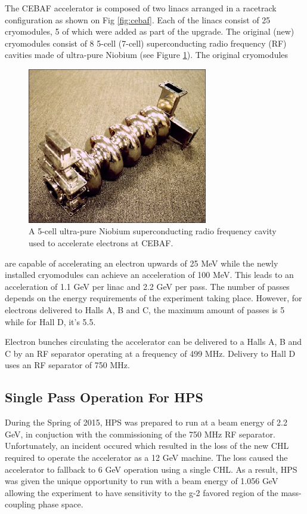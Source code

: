 The CEBAF accelerator is composed of two linacs arranged in a racetrack
configuration as shown on Fig \ref{fig:cebaf}. Each of the linacs consist
of 25 cryomodules, 5 of which were added as part of the upgrade.  The original
(new) cryomodules consist of 8 5-cell (7-cell) superconducting radio frequency
(RF) cavities made of ultra-pure Niobium (see Figure \ref{fig:cebaf_cavity}).  
The original cryomodules
\begin{figure}[h]
    \centering
    \includegraphics[width=0.7\textwidth]{images/cebaf_cavity.jpg}
    \caption{A 5-cell ultra-pure Niobium superconducting radio frequency cavity
             used to accelerate electrons at CEBAF.}
    \label{fig:cebaf_cavity}
\end{figure}
are capable of accelerating an electron upwards of 25 MeV while the newly installed
cryomodules can achieve an acceleration of 100 MeV.  This leads to an acceleration
of 1.1 GeV per linac and 2.2 GeV per pass. The 
number of passes depends on the energy requirements of the experiment taking place.
However, for electrons delivered to Halls A, B and C, the maximum amount of passes
is 5 while for Hall D, it's 5.5.

Electron bunches circulating the accelerator can be delivered to a Halls A, B
and C by an RF separator operating at a frequency of 499 MHz.  Delivery to Hall
D uses an RF separator of 750 MHz.

\subsection{Single Pass Operation For HPS}

During the Spring of 2015, HPS was prepared to run at a beam energy of 2.2 GeV,
in conjuction with the commissioning of the 750 MHz RF separator.
Unfortunately, an incident occured which resulted in the loss of the new CHL
required to operate the accelerator as a 12 GeV machine.
The loss caused the accelerator to 
fallback to 6 GeV operation using a single CHL.  As a result, HPS was given
the unique opportunity to run with a beam energy of 1.056 GeV allowing the
experiment to have sensitivity to the g-2 favored region of the mass-coupling
phase space.  

